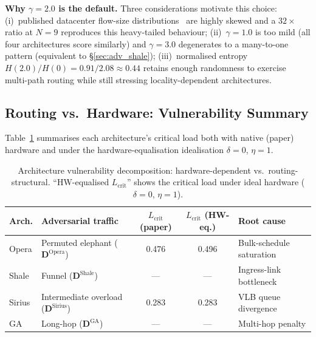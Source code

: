 \documentclass{article}
\begin{document}
    \textbf{Why $\gamma = 2.0$ is the default.}  Three considerations motivate this choice: (i)~published datacenter flow-size distributions~\cite{opera} are highly skewed and a $32\times$ ratio at $N=9$ reproduces this heavy-tailed behaviour; (ii)~$\gamma=1.0$ is too mild (all four architectures score similarly) and $\gamma=3.0$ degenerates to a many-to-one pattern (equivalent to \S\ref{sec:adv_shale}); (iii)~normalised entropy $H(2.0)/H(0) = 0.91/2.08 \approx 0.44$ retains enough randomness to exercise multi-path routing while still stressing locality-dependent architectures.

    \subsection{Routing vs.\ Hardware: Vulnerability Summary}
    \label{sec:arch_pure_summary}

    Table~\ref{tab:arch_pure_vulnerability} summarises each architecture's critical load both with native (paper) hardware and under the hardware-equalisation idealisation $\delta=0$, $\eta=1$.

    \begin{table}[H]
        \centering
        \caption{Architecture vulnerability decomposition: hardware-dependent vs.\ routing-structural.  ``HW-equalised $L_{\text{crit}}$'' shows the critical load under ideal hardware ($\delta = 0$, $\eta = 1$).}
        \begin{tabular}{|l|l|c|c|l|}
            \hline
            \textbf{Arch.} & \textbf{Adversarial traffic} & $L_{\text{crit}}$ (paper) & $L_{\text{crit}}$ (HW-eq.) & \textbf{Root cause} \\
            \hline
            Opera  & Permuted elephant ($\mathbf{D}^{\text{Opera}}$) & 0.476 & 0.496 & Bulk-schedule saturation \\
            Shale  & Funnel ($\mathbf{D}^{\text{Shale}}$)        & --- & --- & Ingress-link bottleneck \\
            Sirius & Intermediate overload ($\mathbf{D}^{\text{Sirius}}$) & 0.283 & 0.283 & VLB queue divergence \\
            GA     & Long-hop ($\mathbf{D}^{\text{GA}}$)         & --- & --- & Multi-hop penalty \\
            \hline
        \end{tabular}
        \label{tab:arch_pure_vulnerability}
    \end{table}
\end{document}
